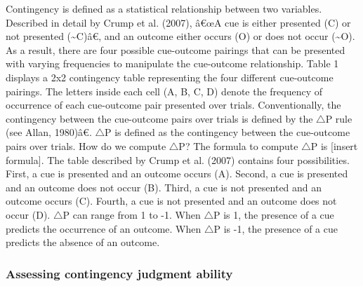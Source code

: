 \documentclass[
  english,
  man,floatsintext]{apa6}
\begin{document}
Contingency is defined as a statistical relationship between two variables. Described in detail by Crump et al. (2007), â€œA cue is either presented (C) or not presented (\textasciitilde C)â€, and an outcome either occurs (O) or does not occur (\textasciitilde O). As a result, there are four possible cue-outcome pairings that can be presented with varying frequencies to manipulate the cue-outcome relationship. Table 1 displays a 2x2 contingency table representing the four different cue-outcome pairings. The letters inside each cell (A, B, C, D) denote the frequency of occurrence of each cue-outcome pair presented over trials. Conventionally, the contingency between the cue-outcome pairs over trials is defined by the \(\triangle\)P rule (see Allan, 1980)â€. \(\triangle\)P is defined as the contingency between the cue-outcome pairs over trials. How do we compute \(\triangle\)P? The formula to compute \(\triangle\)P is {[}insert formula{]}. The table described by Crump et al. (2007) contains four possibilities. First, a cue is presented and an outcome occurs (A). Second, a cue is presented and an outcome does not occur (B). Third, a cue is not presented and an outcome occurs (C). Fourth, a cue is not presented and an outcome does not occur (D). \(\triangle\)P can range from 1 to -1. When \(\triangle\)P is 1, the presence of a cue predicts the occurrence of an outcome. When \(\triangle\)P is -1, the presence of a cue predicts the absence of an outcome.

\hypertarget{assessing-contingency-judgment-ability}{%
\subsubsection{Assessing contingency judgment ability}\label{assessing-contingency-judgment-ability}}
\end{document}
